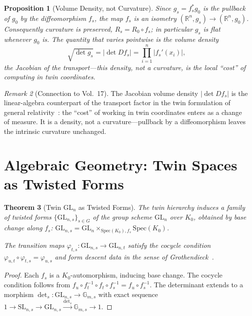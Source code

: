\documentclass[11pt,twocolumn]{article}
\theoremstyle{plain}
\newtheorem{theorem}{Theorem}
\newtheorem{proposition}[theorem]{Proposition}
\theoremstyle{definition}
\theoremstyle{remark}
\newtheorem{remark}[theorem]{Remark}
\begin{document}
\begin{proposition}[Volume Density, not Curvature]\label{prop:density}
Since $g_s = f_s^* g_0$ is the pullback of $g_0$ by the diffeomorphism $f_s$, the map $f_s$ is an isometry $(\mathbb{R}^n, g_s) \to (\mathbb{R}^n, g_0)$. Consequently curvature is \emph{preserved}, $R_s = R_0 \circ f_s$; in particular $g_s$ is flat whenever $g_0$ is. The quantity that varies pointwise is the \emph{volume density}
\[
\sqrt{\det g_s} = |\det Df_s| = \prod_{i=1}^n |f_s'(x_i)|,
\]
the Jacobian of the transport---this density, not a curvature, is the local ``cost'' of computing in twin coordinates.
\end{proposition}

\begin{remark}[Connection to Vol.~17]
The Jacobian volume density $|\det Df_s|$ is the linear-algebra counterpart of the transport factor in the twin formulation of general relativity~\cite{nembe2026vol17}: the ``cost'' of working in twin coordinates enters as a change of measure. It is a density, not a curvature---pullback by a diffeomorphism leaves the intrinsic curvature unchanged.
\end{remark}


\section{Algebraic Geometry: Twin Spaces as Twisted Forms}
\label{sec:alg-geom}

\begin{theorem}[Twin $\mathrm{GL}_n$ as Twisted Forms]\label{thm:twisted-forms}
The twin hierarchy induces a family of twisted forms $\{\mathrm{GL}_{n,s}\}_{s \in G}$ of the group scheme $\mathrm{GL}_n$ over $K_0$, obtained by base change along $f_s$:
$\mathrm{GL}_{n,s} = \mathrm{GL}_n \times_{\mathrm{Spec}(K_0), f_s} \mathrm{Spec}(K_0)$.

The transition maps $\varphi_{t,s}: \mathrm{GL}_{n,s} \to \mathrm{GL}_{n,t}$ satisfy the cocycle condition $\varphi_{u,t} \circ \varphi_{t,s} = \varphi_{u,s}$ and form descent data in the sense of Grothendieck~\cite{grothendieck1960}.
\end{theorem}

\begin{proof}
Each $f_s$ is a $K_0$-automorphism, inducing base change. The cocycle condition follows from $f_u \circ f_t^{-1} \circ f_t \circ f_s^{-1} = f_u \circ f_s^{-1}$. The determinant extends to a morphism $\det_s: \mathrm{GL}_{n,s} \to \mathbb{G}_{m,s}$ with exact sequence $1 \to \mathrm{SL}_{n,s} \to \mathrm{GL}_{n,s} \xrightarrow{\det_s} \mathbb{G}_{m,s} \to 1$.
\end{proof}
\end{document}
